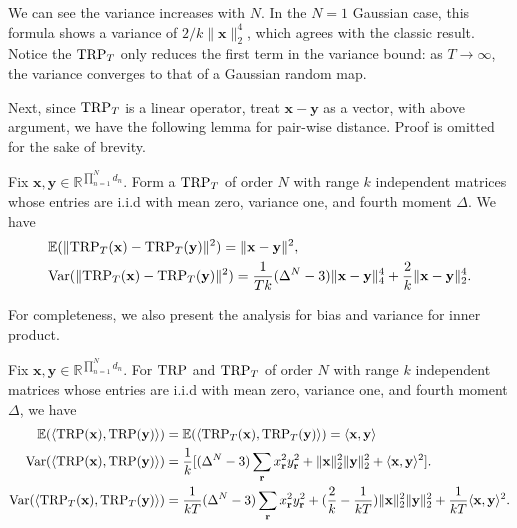 We can see the variance increases with $N$.
In the $N=1$ Gaussian case, this formula shows a variance of $2/k \|\mathbf{x}\|_2^4$,
which agrees with the classic result.
Notice the $\textup{TRP}_T$ only reduces the first term in the variance bound:
as $T\rightarrow \infty$, the variance converges to that of a Gaussian random map.\par 

Next, since $\textup{TRP}_T$ is a linear operator, treat $\mathbf{x}-\mathbf{y}$ as a vector, with above argument,  we have the following lemma for pair-wise distance.  Proof is omitted for the sake of brevity. 

\begin{cor}\label{cor:pairwise-distance-unbias-variance} 
	Fix $\mathbf{x}, \mathbf{y} \in \mathbb{R}^{\prod_{n=1}^N d_n}$. Form a $\textup{TRP}_T$ of order $N$ with range $k$ independent matrices whose entries are i.i.d with mean zero, variance one, and fourth moment $\Delta$. We have
	\begin{equation}
	\begin{aligned}
	&\mathbb{E} (\|\textup{TRP}_T(\mathbf{x}) - \textup{TRP}_T(\mathbf{y})\|^2) = \|\mathbf{x}-\mathbf{y}\|^2,  \\ 
	&\mbox{Var}(\|\textup{TRP}_T(\mathbf{x}) - \textup{TRP}_T(\mathbf{y})\|^2) = \frac{1}{Tk}(\Delta^N-3)\|\mathbf{x} - \mathbf{y} \|_4^4 + \frac{2}{k}\|\mathbf{x}-\mathbf{y}\|_2^4. 
	\end{aligned}
	\end{equation}
\end{cor}


For completeness,  we also present the analysis for bias and variance for inner product. 

\begin{lem} \label{lem:inner_product_TRP}
	Fix $\mathbf{x}, \mathbf{y} \in \mathbb{R}^{\prod_{n=1}^N d_n}$. For $\textup{TRP}$ and $\textup{TRP}_T$ of order $N$ with range $k$ independent matrices whose entries are i.i.d with mean zero, variance one, and fourth moment $\Delta$, we have 
	\begin{equation}
	\begin{aligned}
	 \mathbb{E} (\langle \textup{TRP}(\mathbf{x}), \textup{TRP}(\mathbf{y}) \rangle) &= \mathbb{E} (\langle \textup{TRP}_T(\mathbf{x}), \textup{TRP}_T(\mathbf{y}) \rangle) = \langle \mathbf{x}, \mathbf{y}\rangle  \\ 
	 \mbox{Var}(\langle \textup{TRP}(\mathbf{x}), \textup{TRP}(\mathbf{y}) \rangle) &=\frac{1}{k} [ (\Delta^N - 3) \sum_{\mathbf{r}}x_{\mathbf{r}}^2y_{\mathbf{r}}^2  + \|\mathbf{x}\|_2^2\|\mathbf{y}\|^2_2 + \langle \mathbf{x}, \mathbf{y} \rangle^2].\\ 
	\mbox{Var}(\langle \textup{TRP}_T(\mathbf{x}), \textup{TRP}_T(\mathbf{y}) \rangle) &= \frac{1}{kT}(\Delta^N -3) \sum_{\mathbf{r}}x_{\mathbf{r}}^2y_{\mathbf{r}}^2 +  (\frac{2}{k} - \frac{1}{kT})\|\mathbf{x}\|_2^2\|\mathbf{y}\|_2^2 + \frac{1}{kT}\langle \mathbf{x}, \mathbf{y} \rangle^2. 
	\end{aligned}
	\end{equation}
\end{lem}

